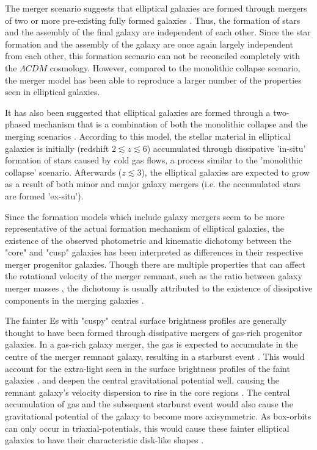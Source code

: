 \documentclass[english, oneside]{HYgradu}
\begin{document}
The merger scenario suggests that elliptical galaxies are formed through mergers of two or more pre-existing fully formed galaxies \citep{GalaxyFormationAndEvo2010}. Thus, the formation of stars and the assembly of the final galaxy are independent of each other. Since the star formation and the assembly of the galaxy are once again largely independent from each other, this formation scenario can not be reconciled completely with the $\Lambda CDM$ cosmology. However, compared to the monolithic collapse scenario, the merger model has been able to reproduce a larger number of the properties seen in elliptical galaxies.

It has also been suggested that elliptical galaxies are formed through a two-phased mechanism that is a combination of both the monolithic collapse and the merging scenarios \citep[e.g.][]{Oser2010}. According to this model, the stellar material in elliptical galaxies is initially (redshift $2 \lesssim z \lesssim 6$) accumulated through dissipative 'in-situ' formation of stars caused by cold gas flows, a process similar to the 'monolithic collapse' scenario. Afterwards ($z \lesssim 3$), the elliptical galaxies are expected to grow as a result of both minor and major galaxy mergers (i.e. the accumulated stars are formed 'ex-situ'). 

Since the formation models which include galaxy mergers seem to be more representative of the actual formation mechanism of elliptical galaxies, the existence of the observed photometric and kinematic dichotomy between the "core" and "cusp" galaxies has been interpreted as differences in their respective merger progenitor galaxies. Though there are multiple properties that can affect the rotational velocity of the merger remnant, such as the ratio between galaxy merger masses \citep{Naab2003}, the dichotomy is usually attributed to the existence of dissipative components in the merging galaxies \citep{GalaxyFormationAndEvo2010}.

The fainter Es with "cuspy" central surface brightness profiles are generally thought to have been formed through dissipative mergers of gas-rich progenitor galaxies. In a gas-rich galaxy merger, the gas is expected to accumulate in the centre of the merger remnant galaxy, resulting in a starburst event \citep{Barnes1991}. This would account for the extra-light seen in the surface brightness profiles of the faint galaxies \citep{Hopkins2008}, and deepen the central gravitational potential well,  causing the remnant galaxy's velocity dispersion to rise in the core regions \citep{Barnes1996}. The central accumulation of gas and the subsequent starburst event would also cause the gravitational potential of the galaxy to become more axisymmetric. As box-orbits can only occur in triaxial-potentials, this would cause these fainter elliptical galaxies to have their characteristic disk-like shapes \citep{Naab2006}.
\end{document}
